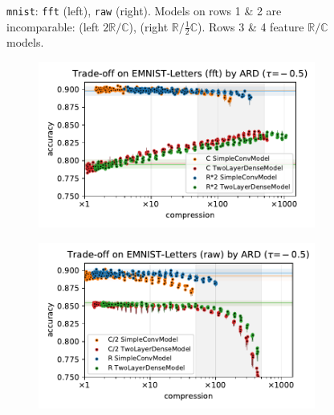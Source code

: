 \documentclass[a4paper,10pt,onecolumn]{article}
\newcommand{\real}{\mathbb{R}}
\newcommand{\cplx}{\mathbb{C}}
\begin{document}
\begin{figure}[b]
\begin{subfigure}[b]{0.5\columnwidth}
  \end{subfigure}
  \caption{%
    \texttt{mnist}:
      \texttt{fft} (left), \texttt{raw} (right).
      Models on rows 1 \& 2 are incomparable: (left $2\real / \cplx$), (right $\real / \tfrac12\cplx$).
      Rows 3 \& 4 feature $\real / \cplx$ models.
  }
\end{figure}

\begin{figure}[b]
  \centering
  \begin{subfigure}[b]{0.5\columnwidth}
    \centering
    \includegraphics[width=\columnwidth]{figure__mnist-like__trade-off/appendix__cmp__ARD__emnist_letters__fft__-0.5.pdf}
  \end{subfigure}%
  \begin{subfigure}[b]{0.5\columnwidth}
    \centering
    \includegraphics[width=\columnwidth]{figure__mnist-like__trade-off/appendix__cmp__ARD__emnist_letters__raw__-0.5.pdf}

\end{subfigure}
\end{figure}
\end{document}
